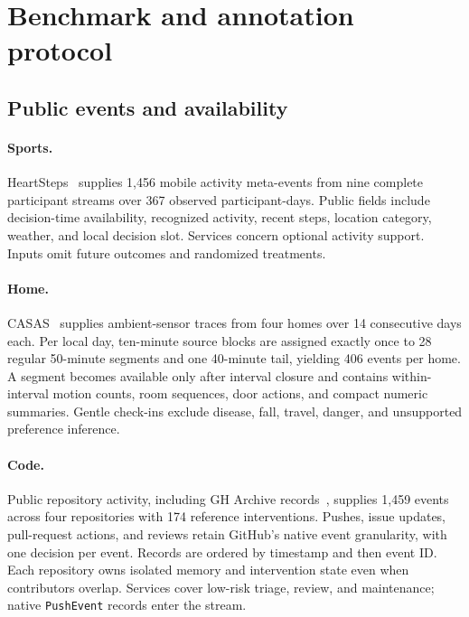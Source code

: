 \section{Benchmark and annotation protocol}
\label{app:benchmark_protocol}

\subsection{Public events and availability}

\paragraph{Sports.}
HeartSteps~\citep{klasnja2019heartsteps} supplies 1,456 mobile activity meta-events from nine complete participant streams over 367 observed participant-days.
Public fields include decision-time availability, recognized activity, recent steps, location category, weather, and local decision slot.
Services concern optional activity support. Inputs omit future outcomes and randomized treatments.

\paragraph{Home.}
CASAS~\citep{cook2013casas} supplies ambient-sensor traces from four homes over 14 consecutive days each.
Per local day, ten-minute source blocks are assigned exactly once to 28 regular 50-minute segments and one 40-minute tail, yielding 406 events per home.
A segment becomes available only after interval closure and contains within-interval motion counts, room sequences, door actions, and compact numeric summaries.
Gentle check-ins exclude disease, fall, travel, danger, and unsupported preference inference.

\paragraph{Code.}
Public repository activity, including GH Archive records~\citep{gharchive}, supplies 1,459 events across four repositories with 174 reference interventions.
Pushes, issue updates, pull-request actions, and reviews retain GitHub's native event granularity, with one decision per event.
Records are ordered by timestamp and then event ID.
Each repository owns isolated memory and intervention state even when contributors overlap.
Services cover low-risk triage, review, and maintenance; native \texttt{PushEvent} records enter the stream.

